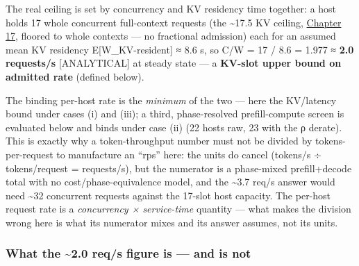 The real ceiling is set by concurrency and KV residency time together: a
host holds 17 whole concurrent full-context requests (the
\textasciitilde17.5 KV ceiling, \hyperref[chap:17]{Chapter 17}, floored to whole contexts
--- no fractional admission) each for an assumed mean KV residency
E{[}W\_KV-resident{]} ≈ 8.6 s, so C/W = 17 / 8.6 = 1.977 ≈ \textbf{2.0
requests/s} \mbox{{[}ANALYTICAL{]}} at steady state --- a \textbf{KV-slot upper
bound on admitted rate} (defined below).

The binding per-host rate is the \emph{minimum} of the two --- here the
KV/latency bound under cases (i) and (iii); a third, phase-resolved
prefill-compute screen is evaluated below and binds under case (ii) (22
hosts raw, 23 with the ρ derate). This is exactly why a token-throughput
number must not be divided by tokens-per-request to manufacture an
``rps'' here: the units do cancel (tokens/s ÷ tokens/request =
requests/s), but the numerator is a phase-mixed prefill+decode total
with no cost/phase-equivalence model, and the \textasciitilde3.7 req/s
answer would need \textasciitilde32 concurrent requests against the
17-slot host capacity. The per-host request rate is a \emph{concurrency
× service-time} quantity --- what makes the division wrong here is what
its numerator mixes and its answer assumes, not its units.

\subsubsection{What the \textasciitilde2.0 req/s figure is --- and is
not}\label{what-the-2.0-reqs-figure-is-and-is-not}

